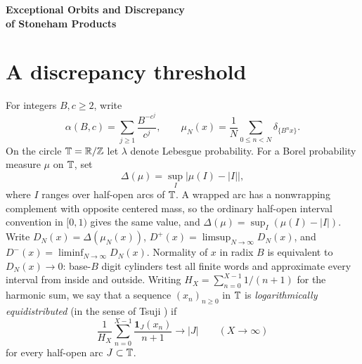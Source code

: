 \documentclass[11pt]{article}
\begin{document}
\begin{center}
{\LARGE\bfseries Exceptional Orbits and Discrepancy\\[2pt] of Stoneham Products\par}
\vspace{0.7em}
\end{center}
\begin{abstract}
For the product of two Stoneham numbers with distinct odd prime parameters coprime to the radix $B$, we describe every subsequential distribution of the radix shifts as a mixture of Lebesgue measure and rational periodic orbits, and prove convergence of the scalar extreme interval discrepancy to that of the mixture. For the binary product $\alpha(2,3)\alpha(2,5)$, the upper interval discrepancy is at most $4/11+2.85\cdot10^{-10}$, and the threshold $4/11$ is equivalent to the upper density of integer shifted prefixes being at most $4/11$. Ordinary binary normality remains open. A finite pair of local interpolation tests yields logarithmic equidistribution, lower discrepancy zero, and at most $O_\varepsilon(\log^* T)$ exceptional logarithmic scales up to $T$, with infinitely many admissible radices for every pair of distinct odd primes. We also record the kernel-verified $43/45$ bound for $\alpha(2,3)\alpha(2,5)$ together with transcendence and strict upper discrepancy for general multiplicatively independent integer parameters. Finally, for rational quadratics in a parameter-two Stoneham number $\alpha(b,2)$, we combine the kernel-verified plateau-cycle law and resonant-radix classification with exact dyadic cycle discrepancies to obtain unconditional upper bounds strictly below one quarter for explicit families, such as $(\alpha^2-2\alpha+C)/3$ for odd radices $b\equiv2\pmod3$ ($C\not\equiv1\pmod3$) and $(\alpha^2-2\alpha)/9$ for $b=5$.
\end{abstract}

\section{A discrepancy threshold}
For integers $B,c\ge2$, write
\[
 \alpha(B,c)=\sum_{j\ge1}\frac{B^{-c^j}}{c^j},\qquad
 \mu_N(x)=\frac1N\sum_{0\le n<N}\delta_{\{B^n x\}} .
\]
On the circle $\mathbb T=\mathbb R/\mathbb Z$ let $\lambda$ denote Lebesgue probability. For a Borel probability measure $\mu$ on $\mathbb T$, set
\[
 \Delta(\mu)=\sup_I|\mu(I)-|I||,
\]
where $I$ ranges over half-open arcs of $\mathbb T$. A wrapped arc has a nonwrapping complement with opposite centered mass, so the ordinary half-open interval convention in $[0,1)$ gives the same value, and $\Delta(\mu)=\sup_I(\mu(I)-|I|)$. Write $D_N(x)=\Delta(\mu_N(x))$, $D^+(x)=\limsup_{N\to\infty} D_N(x)$, and $D^-(x)=\liminf_{N\to\infty} D_N(x)$. Normality of $x$ in radix $B$ is equivalent to $D_N(x)\to0$: base-$B$ digit cylinders test all finite words and approximate every interval from inside and outside. Writing $H_X=\sum_{n=0}^{X-1}1/(n+1)$ for the harmonic sum, we say that a sequence $(x_n)_{n\ge0}$ in $\mathbb T$ is \emph{logarithmically equidistributed} (in the sense of Tsuji \cite{tsuji}) if
\[
 \frac1{H_X}\sum_{n=0}^{X-1}\frac{\mathbf1_J(x_n)}{n+1}\longrightarrow|J|\qquad(X\to\infty)
\]
for every half-open arc $J\subset\mathbb T$.
\end{document}
